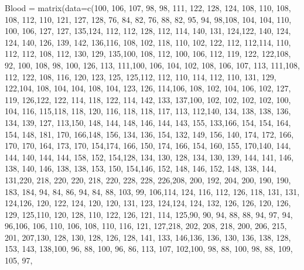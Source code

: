 Blood = matrix(data=c(100, 106, 107, 98, 98, 111, 122, 128, 124, 108, 110, 108, 108, 112, 110, 121, 
127, 128, 76, 84, 82, 76, 88, 82, 95, 94, 98,108, 104, 104, 110, 100, 106, 127, 127, 135,124, 112, 112, 128, 112, 114, 140, 131, 124,122, 140, 124, 124, 140, 126, 139, 142, 136,116, 108, 102, 118, 110, 102, 122, 112, 112,114, 110, 112, 112, 108, 112, 130, 129, 135,100, 108, 112, 100, 106, 112, 119, 122, 122,108, 92, 100, 108, 98, 100, 126, 113, 111,100, 106, 104, 102, 108, 106, 107, 113, 111,108, 112, 122, 108, 116, 120, 123, 125, 125,112, 112, 110, 114, 112, 110, 131, 129, 122,104, 108, 104, 104, 108, 104, 123, 126, 114,106, 108, 102, 104, 106, 102, 127, 119, 126,122, 122, 114, 118, 122, 114, 142, 133, 137,100, 102, 102, 102, 102, 100, 104, 116, 115,118, 118, 120, 116, 118, 118, 117, 113, 112,140, 134, 138, 138, 136, 134, 139, 127, 113,150, 148, 144, 148, 146, 144, 143, 155, 133,166, 154, 154, 164, 154, 148, 181, 170, 166,148, 156, 134, 136, 154, 132, 149, 156, 140,
174, 172, 166, 170, 170, 164, 173, 170, 154,174, 166, 150, 174, 166, 154, 160, 155, 170,140, 144, 144, 140, 144, 144, 158, 152, 154,128, 134, 130, 128, 134, 130, 139, 144, 141,
146, 138, 140, 146, 138, 138, 153, 150, 154,146, 152, 148, 146, 152, 148, 138, 144, 131,220, 218, 220, 220, 218, 220, 228, 228, 226,208, 200, 192, 204, 200, 190, 190, 183, 184,
94, 84, 86, 94, 84, 88, 103, 99, 106,114, 124, 116, 112, 126, 118, 131, 131, 124,126, 120, 122, 124, 120, 120, 131, 123, 124,124, 124, 132, 126, 126, 120, 126, 129, 125,110, 120, 128, 110, 122, 126, 121, 114, 125,90, 90, 94, 88, 88, 94, 97, 94, 96,106, 106, 110, 106, 108, 110, 116, 121, 127,218, 202, 208, 218, 200, 206, 215, 201, 207,130, 128, 130, 128, 126, 128, 141, 133, 146,136, 136, 130, 136, 138, 128, 153, 143, 138,100, 96, 88, 100, 96, 86, 113, 107, 102,100, 98, 88, 100, 98, 88, 109, 105, 97,
